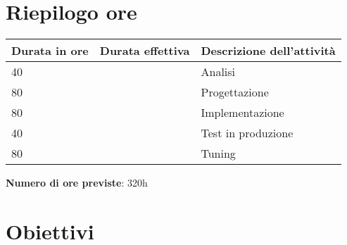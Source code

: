 \documentclass[Tesi.tex]{subfiles}
\begin{document}
\section{Riepilogo ore}
    \begin{longtable}{|p{3cm}|p{4cm}|p{6cm}|}
	\hline
	{\bf Durata in ore} & {\bf Durata effettiva} & {\bf Descrizione dell'attività} \\
	\hline
	40 & & Analisi \\
	\hline
	80 & & Progettazione \\
	\hline
	80 & & Implementazione \\
	\hline
	40 & & Test in produzione \\
	\hline
	80 & & Tuning \\
	\hline
	
\end{longtable}

\textbf{Numero di ore previste}: 320h

\section{Obiettivi} %
\end{document}
